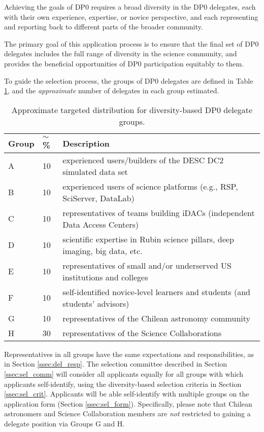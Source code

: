 \documentclass[DM,lsstdraft,authoryear,toc]{lsstdoc}
\begin{document}
Achieving the goals of DP0 requires a broad diversity in the DP0 delegates, each with their own experience, expertise, or novice perspective, and each representing and reporting back to different parts of the broader community.

The primary goal of this application process is to ensure that the final set of DP0 delegates includes the full range of diversity in the science community, and provides the beneficial opportunities of DP0 participation equitably to them.

To guide the selection process, the groups of DP0 delegates are defined in Table \ref{tab:delegate_groups}, and the \emph{approximate} number of delegates in each group estimated.

\begin{table}[!h]
\centering
\caption{Approximate targeted distribution for diversity-based DP0 delegate groups.}\label{tab:delegate_groups}
\begin{tabular}{lll}
\hline
Group & $\sim$\% & Description \\
\hline \hline
A & 10 & experienced users/builders of the DESC DC2 simulated data set \\
B & 10 & experienced users of science platforms (e.g., RSP, SciServer, DataLab) \\
C & 10 & representatives of teams building iDACs (independent Data Access Centers) \\
D & 10 & scientific expertise in Rubin science pillars, deep imaging, big data, etc. \\
E & 10 & representatives of small and/or underserved US institutions and colleges \\
F & 10 & self-identified novice-level learners and students (and students' advisors) \\
G & 10 & representatives of the Chilean astronomy community \\
H & 30 & representatives of the Science Collaborations \\
\hline
\end{tabular}
\end{table}

Representatives in all groups have the same expectations and responsibilities, as in Section \ref{ssec:del_resp}.
The selection committee described in Section \ref{ssec:sel_comm} will consider all applicants equally for all groups with which applicants self-identify, using the diversity-based selection criteria in Section \ref{ssec:sel_crit}.
Applicants will be able self-identify with multiple groups on the application form (Section \ref{ssec:sel_form}).
Specifically, please note that Chilean astronomers and Science Collaboration members are {\it not} restricted to gaining a delegate position via Groups G and H. 
\end{document}

